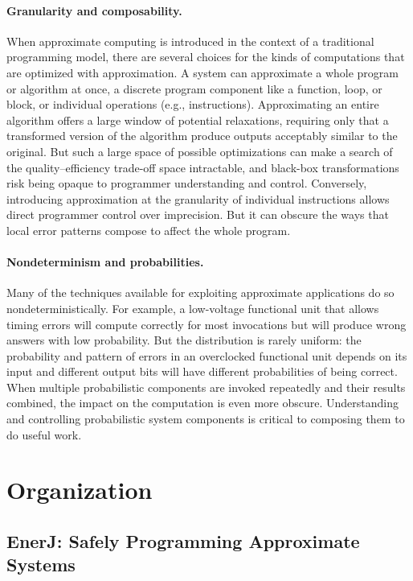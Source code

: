 \paragraph{Granularity and composability.}

When approximate computing is introduced in the context of a traditional
programming model, there are several choices for the kinds of computations
that are optimized with approximation. A system can approximate a whole
program or algorithm at once, a discrete program component like a function,
loop, or block, or individual operations (e.g., instructions).
Approximating an entire algorithm 
offers a large window of potential relaxations,
requiring only that a transformed version of the algorithm produce outputs
acceptably similar to the original.
But such a large space of possible optimizations can make a search of the
quality--efficiency trade-off space intractable, and black-box transformations
risk being opaque to programmer understanding and control.
Conversely, introducing approximation at the granularity of individual
instructions allows direct programmer control over imprecision. But it can
obscure the ways that local error patterns compose to affect the whole
program.

\paragraph{Nondeterminism and probabilities.}

Many of the techniques available for exploiting approximate applications do so
nondeterministically. For example, a low-voltage functional unit that allows
timing errors will compute correctly for most invocations but will produce wrong
answers with low probability. But the distribution is rarely uniform: the
probability and pattern of errors in an overclocked functional unit depends on
its input and different output bits will have different probabilities of being
correct. When multiple probabilistic components are invoked repeatedly and
their results combined, the impact on the computation is even more obscure.
Understanding and controlling probabilistic system components is critical to
composing them to do useful work.


\section{Organization}

\subsection{EnerJ: Safely Programming Approximate Systems}
\label{sec:prelim:enerj}

